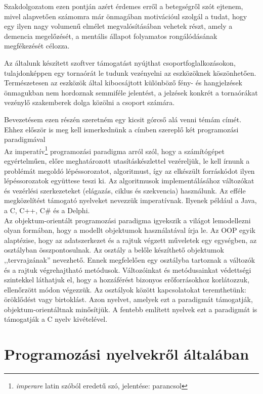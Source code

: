 \documentclass[tocnopagenum]{thesis-ekf}
\theoremstyle{definition}
\theoremstyle{remark}
\begin{document}
	Szakdolgozatom ezen pontján azért érdemes erről a betegségről szót ejtenem, mivel alapvetően számomra már önmagában motivációul szolgál a tudat, hogy egy ilyen nagy volumenű elmélet megvalósításában vehetek részt, amely a demencia megelőzését, a mentális állapot folyamatos rongálódásának megfékezését célozza. 
	\cite{dementia1}
	\cite{dementia2}
	\cite{dementia3}

	Az általunk készített szoftver támogatást nyújthat csoportfoglalkozásokon, tulajdonképpen egy tornaórát le tudunk vezényelni az eszközöknek köszönhetően. Természetesen az eszközök által kibocsájtott különböző fény- és hangjelzések önmagukban nem hordoznak semmiféle jelentést, a jelzések konkrét  a tornaórákat vezénylő szakemberek dolga közölni a csoport számára.
	
	Bevezetésem ezen részén szeretném egy kicsit górcső alá venni témám címét. Ehhez először is meg kell ismerkednünk a címben szereplő két programozási paradigmával\\
 	Az imperatív\footnote{\textit{imperare} latin szóból eredetű szó, jelentése: parancsol} programozási paradigma arról szól, hogy a számítógépet egyértelműen, előre meghatározott utasításkészlettel vezéreljük, le kell írnunk a problémát megoldó lépéssorozatot, algoritmust, így az elkészült forráskódot ilyen lépéssorozatok együttese teszi ki. Az algoritmusok implementálásához változókat és vezérlési szerkezeteket (elágazás, ciklus és szekvencia) használunk. Az efféle megközelítést támogató nyelveket nevezzük imperatívnak. Ilyenek például a Java, a C, C++, C\# és a Delphi.
 	\\
 	Az objektum-orientált programozási paradigma igyekszik a világot lemodellezni olyan formában, hogy a modellt objektumok használatával írja le. Az OOP egyik alaptézise, hogy az adatszerkezet és a rajtuk végzett műveletek egy egységben, az osztályban összpontosulnak. Az osztály a belőle készíthető objektumok ,,tervrajzának'' nevezhető. Ennek megfelelően egy osztályba tartoznak a változók és a rajtuk végrehajtható metódusok. Változóinkat és metódusainkat védettségi szintekkel láthatjuk el, hogy a hozzáférést bizonyos erőforrásokhoz korlátozzuk, ellenőrzött módon végezzük. Az osztályok között kapcsolatokat teremthetünk: öröklődést vagy birtoklást. Azon nyelvet, amelyek ezt a paradigmát támogatják, objektum-orientáltnak minősítjük.
 	A fentebb említett nyelvek ezt a paradigmát is támogatják a C nyelv kivételével.
	\chapter{Programozási nyelvekről általában}
\end{document}
